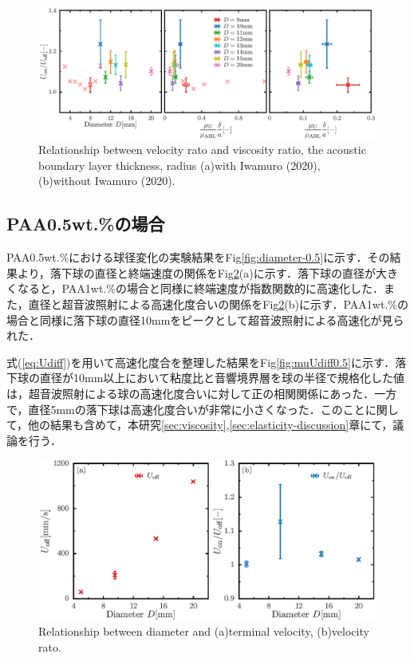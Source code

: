 \begin{figure}[ht]
    \centering
    \includegraphics[width=1\textwidth]{./5-Results/mu_Udiff.eps}
    \caption{Relationship between velocity rato and viscosity ratio, the acoustic boundary layer thickness, radius (a)with Iwamuro (2020), (b)without Iwamuro (2020).}
    \label{fig:muUdiff}
\end{figure}

\newpage

\subsection{PAA0.5wt.\%の場合}
PAA0.5wt.\%における球径変化の実験結果をFig\ref{fig:diameter-0.5}に示す．その結果より，落下球の直径と終端速度の関係をFig\ref{fig:diaUT0.5}(a)に示す．落下球の直径が大きくなると，PAA1wt.\%の場合と同様に終端速度が指数関数的に高速化した．また，直径と超音波照射による高速化度合いの関係をFig\ref{fig:diaUT0.5}(b)に示す．PAA1wt.\%の場合と同様に落下球の直径10mmをピークとして超音波照射による高速化が見られた．

式(\ref{eq:Udiff})を用いて高速化度合を整理した結果をFig\ref{fig:muUdiff0.5}に示す．落下球の直径が10mm以上において粘度比と音響境界層を球の半径で規格化した値は，超音波照射による球の高速化度合いに対して正の相関関係にあった．一方で，直径5mmの落下球は高速化度合いが非常に小さくなった．このことに関して，他の結果も含めて，本研究\ref{sec:viscosity},\ref{sec:elasticity-discussion}章にて，議論を行う．
\begin{figure}[ht]
    \centering
    \includegraphics[width=1\textwidth]{./5-Results/diameter-0.5/diaUT_Udiff.eps}
    \caption{Relationship between diameter and (a)terminal velocity, (b)velocity rato.}
    \label{fig:diaUT0.5}
\end{figure}

